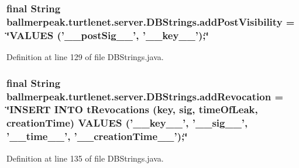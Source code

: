 \hypertarget{classballmerpeak_1_1turtlenet_1_1server_1_1DBStrings_a3a96505a04038ec4631bbeeb7aa64f4d}{
\subsubsection[{add\-Post\-Visibility}]{\setlength{\rightskip}{0pt plus 5cm}final String ballmerpeak.\-turtlenet.\-server.\-D\-B\-Strings.\-add\-Post\-Visibility = \char`\"{}V\-A\-L\-U\-E\-S ('\-\_\-\-\_\-post\-Sig\-\_\-\-\_\-', '\-\_\-\-\_\-key\-\_\-\-\_\-');\char`\"{}\hspace{0.3cm}{\ttfamily [static]}}}\label{classballmerpeak_1_1turtlenet_1_1server_1_1DBStrings_a3a96505a04038ec4631bbeeb7aa64f4d}


Definition at line 129 of file D\-B\-Strings.\-java.

\hypertarget{classballmerpeak_1_1turtlenet_1_1server_1_1DBStrings_a75d68f5b33bdd9fa483ebe6c4145b17e}{
\subsubsection[{add\-Revocation}]{\setlength{\rightskip}{0pt plus 5cm}final String ballmerpeak.\-turtlenet.\-server.\-D\-B\-Strings.\-add\-Revocation = \char`\"{}I\-N\-S\-E\-R\-T I\-N\-T\-O t\-Revocations (key, sig, time\-Of\-Leak, creation\-Time) V\-A\-L\-U\-E\-S ('\-\_\-\-\_\-key\-\_\-\-\_\-', '\-\_\-\-\_\-sig\-\_\-\-\_\-', '\-\_\-\-\_\-time\-\_\-\-\_\-', '\-\_\-\-\_\-creation\-Time\-\_\-\-\_\-');\char`\"{}\hspace{0.3cm}{\ttfamily [static]}}}\label{classballmerpeak_1_1turtlenet_1_1server_1_1DBStrings_a75d68f5b33bdd9fa483ebe6c4145b17e}


Definition at line 135 of file D\-B\-Strings.\-java.

